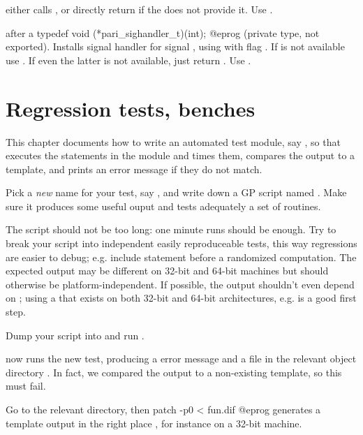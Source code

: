 { either calls , or directly
return  if the  does not provide it. Use .

 after a
\bprog
  typedef void (*pari_sighandler_t)(int);
@eprog\noindent
(private type, not exported). Installs signal handler  for
signal , using  with flag . If
 is not available use . If even the latter is not
available, just return . Use .

\chapter{Regression tests, benches}

This chapter documents how to write an automated test module, say ,
so that  executes the statements in the  module
and times them, compares the output to a template, and prints an error
message if they do not match.

\item Pick a \emph{new} name for your test, say , and write down a
GP script named . Make sure it produces some useful ouput and tests
adequately a set of routines.

\item The script should not be too long: one minute runs should be enough.
Try to break your script into independent easily reproduceable tests, this way
regressions are easier to debug; e.g. include  statement before
a randomized computation. The expected output may be different on 32-bit and
64-bit machines but should otherwise be platform-independent. If possible, the
output shouldn't even depend on ; using a 
that exists on both 32-bit and 64-bit architectures, e.g.  is a
good first step.

\item Dump your script into  and run .

\item {} now runs the new test, producing a \kbd{[BUG]} error
message and a  file in the relevant object directory .
In fact, we compared the output to a non-existing template, so this must fail.

\item Go to the relevant  directory, then
\bprog
  patch -p0 < fun.dif
@eprog\noindent
generates a template output in the right place , for
instance on a 32-bit machine.

}

